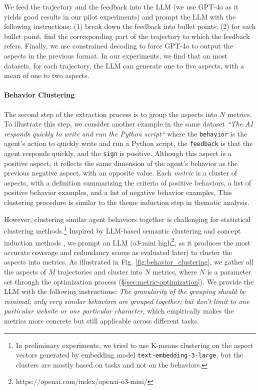 \documentclass[../main.tex]{subfiles}
\begin{document}
We feed the trajectory and the feedback into the LLM (we use GPT-4o \citep{openai2024gpt4ocard}
as it yields good results in our pilot experiments) and prompt the LLM with the following
instructions: (1) break down the feedback into bullet points; (2) for each bullet
point, find the corresponding part of the trajectory to which the feedback
refers. Finally, we use constrained decoding to force GPT-4o to output the
aspects in the previous format. In our experiments, we find that on most
datasets, for each trajectory, the LLM can generate one to five aspects, with a mean
of one to two aspects.

\paragraph{Behavior Clustering}

The second step of the extraction process is to group the aspects into $N$ metrics.
To illustrate this step, we consider another example in the same dataset \textsl{``The
AI responds quickly to write and run the Python script``} where the \texttt{behavior}
is the agent's action to quickly write and run a Python script, the \texttt{feedback}
is that the agent responds quickly, and the \texttt{sign} is positive. Although
this aspect is a positive aspect, it reflects the same dimension of the agent's behavior
as the previous negative aspect, with an opposite value. Each \emph{metric} is a
cluster of aspects, with a definition summarizing the criteria of positive behaviors,
a list of positive behavior examples, and a list of negative behavior examples.
This clustering procedure is similar to the theme induction step in thematic
analysis.

However, clustering similar agent behaviors together is challenging for statistical
clustering methods.\footnote{ In preliminary experiments, we tried to use K-means
clustering on the aspect vectors generated by embedding model \texttt{text-embedding-3-large},
but the clusters are mostly based on tasks and not on the behaviors. } Inspired by
LLM-based semantic clustering and concept induction methods \citep{viswanathan2024large,lam2024concept},
we prompt an LLM (o3-mini high\footnote{https://openai.com/index/openai-o3-mini/},
as it produces the most accurate coverage and redundancy scores as evaluated
later) to cluster the aspects into metrics. As illustrated in Fig. \ref{fig:behavior_clustering},
we gather all the aspects of $M$ trajectories and cluster into $N$ metrics, where
$N$ is a parameter set through the optimization process (\S\ref{sec:metric-optimization}).
We provide the LLM with the following instructions: \emph{The granularity of the
grouping should be minimal; only very similar behaviors are grouped together;
but don't limit to one particular website or one particular character}, which
empirically makes the metrics more concrete but still applicable across
different tasks.
\end{document}
